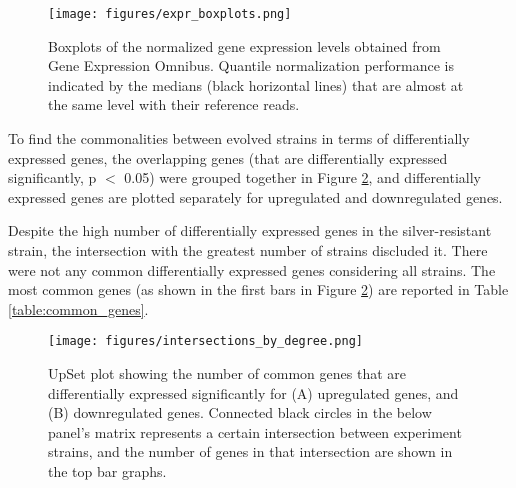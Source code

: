 \begin{figure}[H]
  \begin{center}
  \texttt{[image: figures/expr\_boxplots.png]}
  \caption[Boxplots of the normalized gene expression levels]{Boxplots of the normalized gene expression levels obtained from Gene Expression Omnibus. Quantile normalization performance is indicated by the medians (black horizontal lines) that are almost at the same level with their reference reads.}
  \label{fig:expr_boxplot}
  \end{center}
\end{figure}

\vspace{-1cm}

To find the commonalities between evolved strains in terms of differentially expressed genes, the overlapping genes (that are differentially expressed significantly, p $<$ 0.05) were grouped together in Figure \ref{fig:intersections_by_degree}, and differentially expressed genes are plotted separately for upregulated and downregulated genes.

Despite the high number of differentially expressed genes in the silver-resistant strain, the intersection with the greatest number of strains discluded it. There were not any common differentially expressed genes considering all strains. The most common genes (as shown in the first bars in Figure \ref{fig:intersections_by_degree}) are reported in Table \ref{table:common_genes}.

\begin{figure}[H]
  \begin{center}
  \texttt{[image: figures/intersections\_by\_degree.png]}
  \caption[UpSet plot showing the number of common genes that are differentially expressed significantly for (A) upregulated genes, and (B) downregulated genes. Connected black circles in the below panel's matrix represents a certain intersection between experiment strains, and the number of genes in that intersection are shown in the top bar graphs.]{UpSet plot showing the number of common genes that are differentially expressed significantly for (A) upregulated genes, and (B) downregulated genes. Connected black circles in the below panel's matrix represents a certain intersection between experiment strains, and the number of genes in that intersection are shown in the top bar graphs.}
  \label{fig:intersections_by_degree}
  \end{center}
\end{figure}

